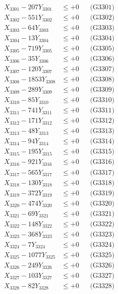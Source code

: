 \documentclass[a4paper,10pt]{article}
\begin{document}
{\begin{align}
\allowbreak
X_{3301} - 207Y_{3301} &\leq +0 && \text{(G3301)} \\
X_{3302} - 551Y_{3302} &\leq +0 && \text{(G3302)} \\
X_{3303} - 64Y_{3303} &\leq +0 && \text{(G3303)} \\
X_{3304} - 13Y_{3304} &\leq +0 && \text{(G3304)} \\
X_{3305} - 719Y_{3305} &\leq +0 && \text{(G3305)} \\
X_{3306} - 35Y_{3306} &\leq +0 && \text{(G3306)} \\
X_{3307} - 120Y_{3307} &\leq +0 && \text{(G3307)} \\
X_{3308} - 1853Y_{3308} &\leq +0 && \text{(G3308)} \\
X_{3309} - 289Y_{3309} &\leq +0 && \text{(G3309)} \\
X_{3310} - 85Y_{3310} &\leq +0 && \text{(G3310)} \\
\allowbreak
X_{3311} - 741Y_{3311} &\leq +0 && \text{(G3311)} \\
X_{3312} - 171Y_{3312} &\leq +0 && \text{(G3312)} \\
X_{3313} - 48Y_{3313} &\leq +0 && \text{(G3313)} \\
X_{3314} - 94Y_{3314} &\leq +0 && \text{(G3314)} \\
X_{3315} - 195Y_{3315} &\leq +0 && \text{(G3315)} \\
X_{3316} - 921Y_{3316} &\leq +0 && \text{(G3316)} \\
X_{3317} - 565Y_{3317} &\leq +0 && \text{(G3317)} \\
X_{3318} - 130Y_{3318} &\leq +0 && \text{(G3318)} \\
X_{3319} - 372Y_{3319} &\leq +0 && \text{(G3319)} \\
X_{3320} - 474Y_{3320} &\leq +0 && \text{(G3320)} \\
\allowbreak
X_{3321} - 69Y_{3321} &\leq +0 && \text{(G3321)} \\
X_{3322} - 148Y_{3322} &\leq +0 && \text{(G3322)} \\
X_{3323} - 368Y_{3323} &\leq +0 && \text{(G3323)} \\
X_{3324} - 7Y_{3324} &\leq +0 && \text{(G3324)} \\
X_{3325} - 1077Y_{3325} &\leq +0 && \text{(G3325)} \\
X_{3326} - 249Y_{3326} &\leq +0 && \text{(G3326)} \\
X_{3327} - 103Y_{3327} &\leq +0 && \text{(G3327)} \\
X_{3328} - 82Y_{3328} &\leq +0 && \text{(G3328)} \\

\end{align}}
\end{document}
